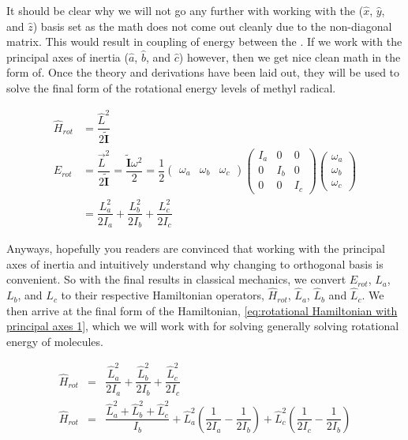\documentclass[11pt,a4paper]{book}
\begin{document}
			\noindent
			It should be clear why we will not go any further with working with the ($\hat{x}$, $\hat{y}$, and  $\hat{z}$) basis set as the math does not come out cleanly due to the non-diagonal matrix. This would result in coupling of energy between the . If we work with the principal axes of inertia ($\hat{a}$, $\hat{b}$, and  $\hat{c}$) however, then we get nice clean math in the form of. Once the theory and derivations have been laid out, they will be used to solve the final form of the rotational energy levels of methyl radical.
			
			\begin{equation*}
				\label{eq:rotational hamiltonian principal axes of inertia}
				\begin{split}
					\hat{H}_{rot} &= \dfrac{\hat{L}^2}{2\tilde{\textbf{I}}} \\
					E_{rot} &=\dfrac{\vec{L}^2}{2\tilde{\textbf{I}}}  =\dfrac{\tilde{\textbf{I}}\omega^2}{2} =
					\dfrac{1}{2}
					\begin{pmatrix}
						\omega_a & \omega_b & \omega_c
					\end{pmatrix}
					\begin{pmatrix}
							I_{a} & 0 & 0  \\
							0 & I_{b} & 0\\
							0 & 0 & I_{c}
					\end{pmatrix}
					\begin{pmatrix}
						\omega_a\\
						\omega_b\\
						\omega_c
					\end{pmatrix}\\
					&=\dfrac{L_a^2}{2I_a} + \dfrac{L_b^2}{2I_b} + \dfrac{L_c^2}{2I_c}
				\end{split}
			\end{equation*}
			
			Anyways, hopefully you readers are convinced that working with the principal axes of inertia and intuitively understand why changing to orthogonal basis is convenient. So with the final results in classical mechanics, we convert $E_{rot}$, $L_a$, $L_b$, and $L_c$ to their respective Hamiltonian operators, $\hat{H}_{rot}$, $\hat{L}_a$, $\hat{L}_b$ and $\hat{L}_c$. We then arrive at the final form of the Hamiltonian, \autoref{eq:rotational Hamiltonian with principal axes 1}, which we will work with for solving generally solving rotational energy of molecules. 
			
			\begin{eqnarray}
				\label{eq:rotational Hamiltonian with principal axes 1}
				\hat{H}_{rot}  &=& \dfrac{\hat{L}_a^2}{2I_a} + \dfrac{\hat{L}_b^2}{2I_b} + \dfrac{\hat{L}_c^2}{2I_c}\\
				\hat{H}_{rot}&=&\dfrac{\hat{L}_a^2 + \hat{L}_b^2 + \hat{L}_c^2}{I_b} + \hat{L}_a^2\left(\dfrac{1}{2I_a}-\dfrac{1}{2I_b}\right) + \hat{L}_c^2\left(\dfrac{1}{2I_c}-\dfrac{1}{2I_b}\right)
				\label{eq:rotational Hamiltonian with principal axes 2}
			\end{eqnarray}			
			
\end{document}
